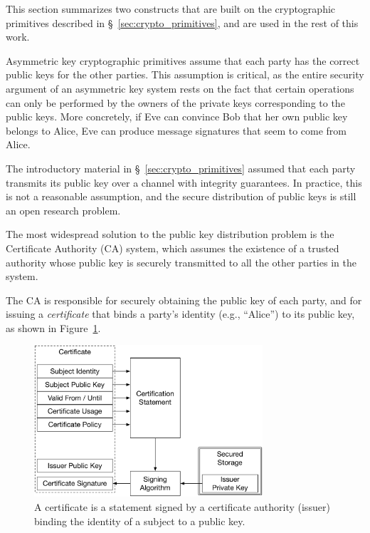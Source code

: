 \label{sec:crypto_constructs}

This section summarizes two constructs that are built on the cryptographic
primitives described in \S~\ref{sec:crypto_primitives}, and are used in the
rest of this work.


\label{sec:certificates}

Asymmetric key cryptographic primitives assume that each party has the correct
public keys for the other parties. This assumption is critical, as the entire
security argument of an asymmetric key system rests on the fact that certain
operations can only be performed by the owners of the private keys
corresponding to the public keys. More concretely, if Eve can convince Bob
that her own public key belongs to Alice, Eve can produce message signatures
that seem to come from Alice.

The introductory material in \S~\ref{sec:crypto_primitives} assumed that each
party transmits its public key over a channel with integrity guarantees. In
practice, this is not a reasonable assumption, and the secure distribution of
public keys is still an open research problem.

The most widespread solution to the public key distribution problem is the
Certificate Authority (CA) system, which assumes the existence of a trusted
authority whose public key is securely transmitted to all the other parties in
the system.

The CA is responsible for securely obtaining the public key of each party, and
for issuing a \textit{certificate} that binds a party's identity (e.g.,
``Alice'') to its public key, as shown in Figure~\ref{fig:certificate}.

\begin{figure}[hbt]
  \centering
  \includegraphics[width=85mm]{figures/certificate.pdf}
  \caption{
    A certificate is a statement signed by a certificate authority (issuer)
    binding the identity of a subject to a public key.
  }
  \label{fig:certificate}
\end{figure}

